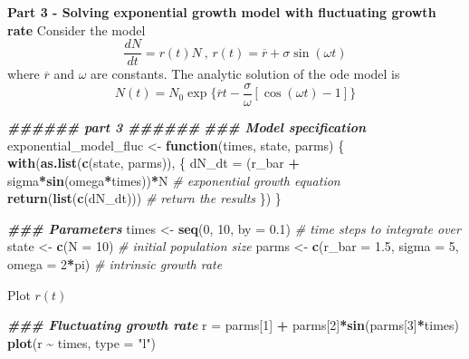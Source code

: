 \documentclass[
]{book}
\newenvironment{Shaded}{\begin{snugshade}}{\end{snugshade}}
\newcommand{\AttributeTok}[1]{\textcolor[rgb]{0.13,0.29,0.53}{#1}}
\newcommand{\CommentTok}[1]{\textcolor[rgb]{0.56,0.35,0.01}{\textit{#1}}}
\newcommand{\ControlFlowTok}[1]{\textcolor[rgb]{0.13,0.29,0.53}{\textbf{#1}}}
\newcommand{\DecValTok}[1]{\textcolor[rgb]{0.00,0.00,0.81}{#1}}
\newcommand{\DocumentationTok}[1]{\textcolor[rgb]{0.56,0.35,0.01}{\textbf{\textit{#1}}}}
\newcommand{\FloatTok}[1]{\textcolor[rgb]{0.00,0.00,0.81}{#1}}
\newcommand{\FunctionTok}[1]{\textcolor[rgb]{0.13,0.29,0.53}{\textbf{#1}}}
\newcommand{\NormalTok}[1]{#1}
\newcommand{\OtherTok}[1]{\textcolor[rgb]{0.56,0.35,0.01}{#1}}
\newcommand{\SpecialCharTok}[1]{\textcolor[rgb]{0.81,0.36,0.00}{\textbf{#1}}}
\newcommand{\StringTok}[1]{\textcolor[rgb]{0.31,0.60,0.02}{#1}}
\begin{document}
\textbf{Part 3 - Solving exponential growth model with fluctuating growth rate}
Consider the model
\[
\frac{dN}{dt} = r(t)N \ \text{, } r(t) = \overline{r} + \sigma\sin(\omega t)
\]
where \(\overline{r}\) and \(\omega\) are constants.
The analytic solution of the ode model is
\[
N(t) = N_0\exp\{\overline{r}t - \frac{\sigma}{\omega}[\cos(\omega t) - 1]\}
\]

\begin{Shaded}
\begin{Highlighting}[]
\DocumentationTok{\#\#\#\#\#\# part 3 \#\#\#\#\#\#}
\DocumentationTok{\#\#\# Model specification}
\NormalTok{exponential\_model\_fluc }\OtherTok{\textless{}{-}} \ControlFlowTok{function}\NormalTok{(times, state, parms) \{}
  \FunctionTok{with}\NormalTok{(}\FunctionTok{as.list}\NormalTok{(}\FunctionTok{c}\NormalTok{(state, parms)), \{}
\NormalTok{    dN\_dt }\OtherTok{=}\NormalTok{ (r\_bar }\SpecialCharTok{+}\NormalTok{ sigma}\SpecialCharTok{*}\FunctionTok{sin}\NormalTok{(omega}\SpecialCharTok{*}\NormalTok{times))}\SpecialCharTok{*}\NormalTok{N  }\CommentTok{\# exponential growth equation}
    \FunctionTok{return}\NormalTok{(}\FunctionTok{list}\NormalTok{(}\FunctionTok{c}\NormalTok{(dN\_dt)))  }\CommentTok{\# return the results}
\NormalTok{  \})}
\NormalTok{\}}
\end{Highlighting}
\end{Shaded}

\begin{Shaded}
\begin{Highlighting}[]
\DocumentationTok{\#\#\# Parameters}
\NormalTok{times }\OtherTok{\textless{}{-}} \FunctionTok{seq}\NormalTok{(}\DecValTok{0}\NormalTok{, }\DecValTok{10}\NormalTok{, }\AttributeTok{by =} \FloatTok{0.1}\NormalTok{)  }\CommentTok{\# time steps to integrate over}
\NormalTok{state }\OtherTok{\textless{}{-}} \FunctionTok{c}\NormalTok{(}\AttributeTok{N =} \DecValTok{10}\NormalTok{)  }\CommentTok{\# initial population size}
\NormalTok{parms }\OtherTok{\textless{}{-}} \FunctionTok{c}\NormalTok{(}\AttributeTok{r\_bar =} \FloatTok{1.5}\NormalTok{, }\AttributeTok{sigma =} \DecValTok{5}\NormalTok{, }\AttributeTok{omega =} \DecValTok{2}\SpecialCharTok{*}\NormalTok{pi)  }\CommentTok{\# intrinsic growth rate}
\end{Highlighting}
\end{Shaded}

Plot \(r(t)\)

\begin{Shaded}
\begin{Highlighting}[]
\DocumentationTok{\#\#\# Fluctuating growth rate}
\NormalTok{r }\OtherTok{=}\NormalTok{ parms[}\DecValTok{1}\NormalTok{] }\SpecialCharTok{+}\NormalTok{ parms[}\DecValTok{2}\NormalTok{]}\SpecialCharTok{*}\FunctionTok{sin}\NormalTok{(parms[}\DecValTok{3}\NormalTok{]}\SpecialCharTok{*}\NormalTok{times)}
\FunctionTok{plot}\NormalTok{(r }\SpecialCharTok{\textasciitilde{}}\NormalTok{ times, }\AttributeTok{type =} \StringTok{"l"}\NormalTok{)}
\end{Highlighting}
\end{Shaded}
\end{document}
